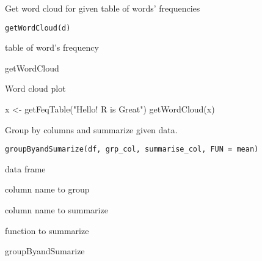 \documentclass[a4paper]{book}
\begin{document}
%
\begin{Description}\relax
Get word cloud for given table of words' frequencies
\end{Description}
%
\begin{Usage}
\begin{verbatim}
getWordCloud(d)
\end{verbatim}
\end{Usage}
%
\begin{Arguments}
\begin{ldescription}
\item[\code{d}] table of word's frequency
\end{ldescription}
\end{Arguments}
%
\begin{Details}\relax
getWordCloud
\end{Details}
%
\begin{Value}
Word cloud plot
\end{Value}
%
\begin{Examples}
\begin{ExampleCode}
x <- getFeqTable("Hello! R is Great")
getWordCloud(x)
\end{ExampleCode}
\end{Examples}
%
\begin{Description}\relax
Group by columns and summarize given data.
\end{Description}
%
\begin{Usage}
\begin{verbatim}
groupByandSumarize(df, grp_col, summarise_col, FUN = mean)
\end{verbatim}
\end{Usage}
%
\begin{Arguments}
\begin{ldescription}
\item[\code{df}] data frame

\item[\code{grp\_col}] column name to group

\item[\code{summarise\_col}] column name to summarize

\item[\code{FUN}] function to summarize
\end{ldescription}
\end{Arguments}
%
\begin{Details}\relax
groupByandSumarize
\end{Details}
\end{document}
